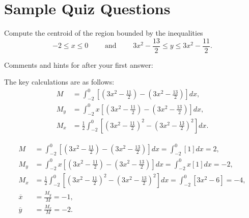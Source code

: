 \documentclass{ximera}
\begin{document}
\section*{Sample Quiz Questions}
\begin{question}%

Compute the centroid of the region bounded by the inequalities \[-2 \leq x \leq 0 \qquad \text{ and } \qquad {3x^2-\frac{13}{2}} \leq y \leq {3x^2-\frac{11}{2}}.\]
\begin{multiplechoice}
\end{multiplechoice}
Comments and hints for after your first answer:
\begin{feedback}
The key calculations are as follows: 
\[ \begin{aligned}
M & = \int_{-2}^{0} \left[ \left({3x^2-\frac{11}{2}}\right) - \left({3x^2-\frac{13}{2}}\right) \right] dx , \\
M_y & = \int_{-2}^{0} x \left[ \left({3x^2-\frac{11}{2}}\right) - \left({3x^2-\frac{13}{2}}\right) \right] dx, \\
M_x & = \frac{1}{2} \int_{-2}^{0} \left[ \left({3x^2-\frac{11}{2}}\right)^2 - \left({3x^2-\frac{13}{2}}\right)^2 \right] dx.
\end{aligned}\]
 \begin{hint}
 \[ \begin{aligned}
M & = \int_{-2}^{0} \left[ \left({3x^2-\frac{11}{2}}\right) - \left({3x^2-\frac{13}{2}}\right) \right] dx = \int_{-2}^{0} \left[{1}\right] dx = 2, \\
M_y & = \int_{-2}^{0} x \left[ \left({3x^2-\frac{11}{2}}\right) - \left({3x^2-\frac{13}{2}}\right) \right] dx = \int_{-2}^{0} x \left[{1}\right] dx = -2, \\
M_x & = \frac{1}{2} \int_{-2}^{0} \left[ \left({3x^2-\frac{11}{2}}\right)^2 - \left({3x^2-\frac{13}{2}}\right)^2 \right] dx = \int_{-2}^{0} \left[{3x^2-6}\right] = -4, \\
 \overline{x} &  = \frac{M_y}{M} = -1, \\
 \overline{y} &  = \frac{M_x}{M} = -2.\end{aligned}\]
 \end{hint}
\end{feedback}

\end{question}
\end{document}
